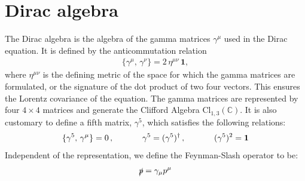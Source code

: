 \documentclass[oneside, openany]{book}
\numberwithin{equation}{chapter}
\numberwithin{figure}{chapter}
\newcommand{\p}[0]{\slashed{p}}
\newcommand{\g}[0]{\gamma}
\begin{document}
\section{Dirac algebra} \label{ch:A}
The Dirac algebra is the algebra of the gamma matrices $\g^\mu$ used in the Dirac equation. It is defined by the anticommutation relation
\begin{align}
	\{ \g^\mu,\, \g^\nu \} = 2\,\eta^{\mu\nu} \,\mathbf 1,
\end{align}
where $\eta^{\mu\nu}$ is the defining metric of the space for which the gamma matrices are formulated, or the signature of the dot product of two four vectors.
This ensures the Lorentz covariance of the equation. The gamma matrices are represented by four $4\times4$ matrices and generate the Clifford Algebra ${\displaystyle {\text{Cl}}_{1,3}(\mathbb {C} )}$. It is also customary to define a fifth matrix, $\g^5$, which satisfies the following relations:
\begin{align}
	\{ \g^5,\, \g^\mu \} = 0\,,\hspace{1.2cm} \g^5 = (\g^5)^\dagger\,, \hspace{1.2cm} (\g^5)^2 = \mathbf 1
\end{align}
Independent of the representation, we define the Feynman-Slash operator to be:
\begin{align*}
	\p = \g_\mu p^\mu
\end{align*}
\end{document}
